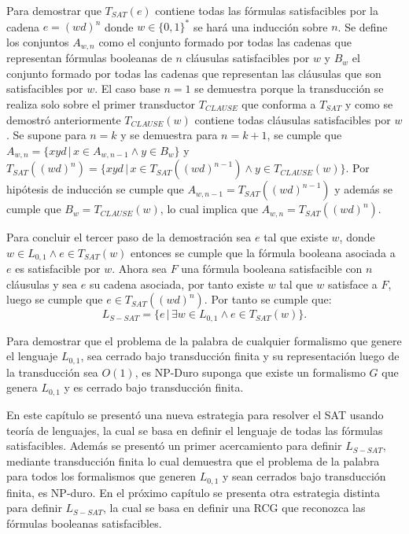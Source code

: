 Para demostrar que $T_{SAT}(e)$ contiene todas las fórmulas satisfacibles por la cadena $e=(wd)^n$ donde $w\in\{0,1\}^*$ se hará una inducción sobre $n$. Se define los conjuntos $A_{w,n}$ como el conjunto formado por todas las cadenas que representan fórmulas booleanas de $n$ cláusulas satisfacibles por $w$ y $B_w$ el conjunto formado por todas las cadenas que representan las cláusulas que son satisfacibles por $w$. El caso base $n=1$ se demuestra porque la transducción se realiza solo sobre el primer transductor $T_{CLAUSE}$ que conforma a $T_{SAT}$ y como se demostró anteriormente $T_{CLAUSE}(w)$ contiene todas cláusulas satisfacibles por $w$.  Se supone para $n=k$ y se demuestra para $n=k+1$, se cumple que $A_{w,n}=\{xyd\,|\,x\in A_{w,n-1} \wedge y\in B_w\}$ y $T_{SAT}((wd)^n)=\{xyd\,|\,x\in T_{SAT}((wd)^{n-1}) \wedge y\in T_{CLAUSE}(w)\}$. Por hipótesis de inducción se cumple que $A_{w,n-1}=T_{SAT}((wd)^{n-1})$ y además se cumple que $B_w=T_{CLAUSE}(w)$, lo cual implica que $A_{w,n}=T_{SAT}((wd)^n)$.

Para concluir el tercer paso de la demostración sea $e$ tal que existe $w$, donde $w \in L_{0,1} \wedge e \in T_{SAT}(w)$ entonces se cumple que la fórmula booleana asociada a $e$ es satisfacible por $w$. Ahora sea $F$ una fórmula booleana satisfacible con $n$ cláusulas y sea $e$ su cadena asociada, por tanto existe $w$ tal que $w$ satisface a $F$, luego se cumple que $e\in T_{SAT}((wd)^n)$. Por tanto se cumple que:
$$L_{S-SAT} = \{e\,|\,\exists w \in L_{0,1} \wedge e \in T_{SAT}(w) \}.$$

Para demostrar que el problema de la palabra de cualquier formalismo que genere el lenguaje $L_{0,1}$, sea 
cerrado bajo transducción finita y su representación luego de la transducción sea $O(1)$, es NP-Duro suponga 
que existe un formalismo $G$ que genera $L_{0,1}$ y es cerrado bajo transducción finita.

En este capítulo se presentó una nueva estrategia para resolver el SAT usando teoría de lenguajes, la cual se basa en
definir el lenguaje de todas las fórmulas satisfacibles. Además se presentó un primer acercamiento para definir $L_{S-SAT}$, mediante
transducción finita lo cual demuestra que  el problema de la palabra para todos los formalismos que generen $L_{0,1}$ y sean cerrados bajo transducción
finita, es NP-duro. En el próximo capítulo se presenta otra estrategia distinta para definir $L_{S-SAT}$, la cual se basa
en definir una RCG que reconozca las fórmulas booleanas satisfacibles.

